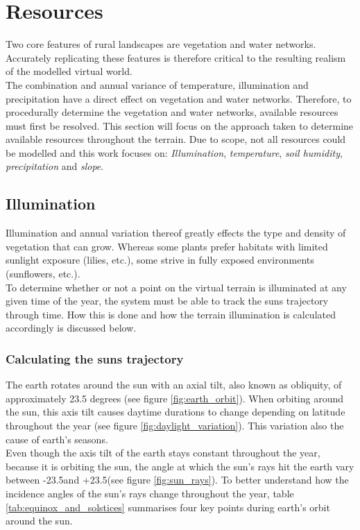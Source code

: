 \section{Resources}

Two core features of rural landscapes are vegetation and water networks. Accurately replicating these features is therefore critical to the resulting realism of the modelled virtual world.\\
The combination and annual variance of temperature, illumination and precipitation have a direct effect on vegetation and water networks. Therefore, to procedurally determine the vegetation and water networks, available resources must first be resolved. This section will focus on the approach taken to determine available resources throughout the terrain. Due to scope, not all resources could be modelled and this work focuses on: \textit{Illumination}, \textit{temperature}, \textit{soil humidity}, \textit{precipitation} and \textit{slope}. 

\subsection{Illumination}

Illumination and annual variation thereof greatly effects the type and density of vegetation that can grow. Whereas some plants prefer habitats with limited sunlight exposure (lilies, etc.), some strive in fully exposed environments (sunflowers, etc.). \\
To determine whether or not a point on the virtual terrain is illuminated at any given time of the year, the system must be able to track the suns trajectory through time. How this is done and how the terrain illumination is calculated accordingly is discussed below.

\subsubsection{Calculating the suns trajectory}

The earth rotates around the sun with an axial tilt, also known as obliquity, of approximately 23.5 degrees (see figure \ref{fig:earth_orbit}). When orbiting around the sun, this axis tilt causes daytime durations to change depending on latitude throughout the year  (see figure \ref{fig:daylight_variation}). This variation also the cause of earth's seasons. \\

Even though the axis tilt of the earth stays constant throughout the year, because it is orbiting the sun, the angle at which the sun's rays hit the earth vary between -23.5\textdegree and +23.5\textdegree (see figure \ref{fig:sun_rays}).
To better understand how the incidence angles of the sun's rays change throughout the year, table \ref{tab:equinox_and_solstices} summarises four key points during earth's orbit around the sun.\\

